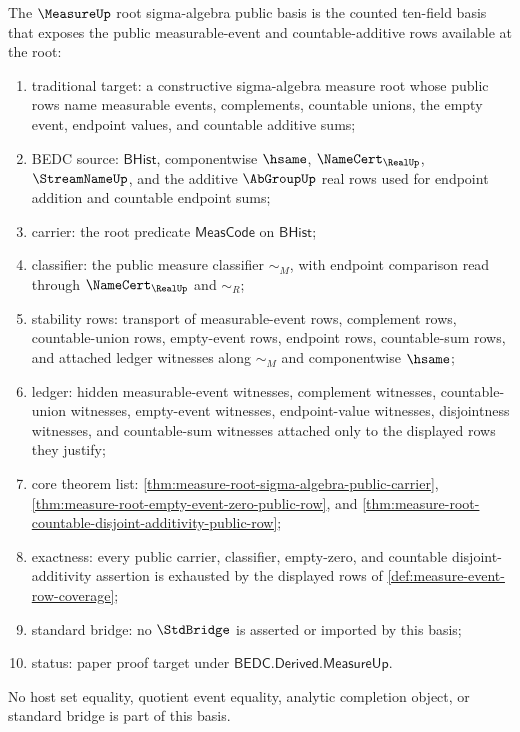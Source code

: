 \begin{definition}
\label{def:measure-root-sigma-algebra-public-basis}
The $\MeasureUp$ root sigma-algebra public basis is the counted ten-field
basis that exposes the public measurable-event and countable-additive rows
available at the root:
\begin{enumerate}
  \item traditional target: a constructive sigma-algebra measure root whose
  public rows name measurable events, complements, countable unions, the
  empty event, endpoint values, and countable additive sums;
  \item BEDC source: $\mathsf{BHist}$, componentwise $\hsame$,
  $\NameCert_{\RealUp}$, $\StreamNameUp$, and the additive $\AbGroupUp$
  real rows used for endpoint addition and countable endpoint sums;
  \item carrier: the root predicate $\mathsf{MeasCode}$ on
  $\mathsf{BHist}$;
  \item classifier: the public measure classifier $\sim_M$, with endpoint
  comparison read through $\NameCert_{\RealUp}$ and $\sim_R$;
  \item stability rows: transport of measurable-event rows, complement
  rows, countable-union rows, empty-event rows, endpoint rows, countable-sum
  rows, and attached ledger witnesses along $\sim_M$ and componentwise
  $\hsame$;
  \item ledger: hidden measurable-event witnesses, complement witnesses,
  countable-union witnesses, empty-event witnesses, endpoint-value witnesses,
  disjointness witnesses, and countable-sum witnesses attached only to the
  displayed rows they justify;
  \item core theorem list:
  \autoref{thm:measure-root-sigma-algebra-public-carrier},
  \autoref{thm:measure-root-empty-event-zero-public-row}, and
  \autoref{thm:measure-root-countable-disjoint-additivity-public-row};
  \item exactness: every public carrier, classifier, empty-zero, and
  countable disjoint-additivity assertion is exhausted by the displayed
  rows of \autoref{def:measure-event-row-coverage};
  \item standard bridge: no $\StdBridge$ is asserted or imported by this
  basis;
  \item status: paper proof target under
  $\mathsf{BEDC.Derived.MeasureUp}$.
\end{enumerate}
No host set equality, quotient event equality, analytic completion object,
or standard bridge is part of this basis.
\end{definition}

